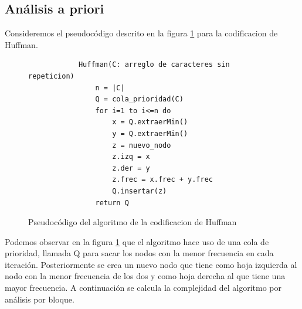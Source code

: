 \hfill \break

\subsection*{Análisis a priori}

    Consideremos el pseudocódigo descrito en la figura \ref{PseudocodigoHuffman} para la codificacion de Huffman.

    \begin{figure}[h!]
        \centering
        \begin{verbatim}
            Huffman(C: arreglo de caracteres sin repeticion)
                n = |C|
                Q = cola_prioridad(C)
                for i=1 to i<=n do
                    x = Q.extraerMin()
                    y = Q.extraerMin()
                    z = nuevo_nodo
                    z.izq = x
                    z.der = y
                    z.frec = x.frec + y.frec
                    Q.insertar(z)
                return Q
        \end{verbatim}  
        \caption{Pseudocódigo del algoritmo de la codificacion de Huffman}
        \label{PseudocodigoHuffman}
    \end{figure}
    
    Podemos observar en la figura \ref{PseudocodigoHuffman} que el algoritmo hace uso de una cola de prioridad, llamada Q para sacar los nodos con la menor frecuencia en cada iteración. Posteriormente se crea un nuevo nodo que tiene como hoja izquierda al nodo con la menor frecuencia de los dos y como hoja derecha al que tiene una mayor frecuencia. A continuación se calcula la complejidad del algoritmo por análisis por bloque.
    

